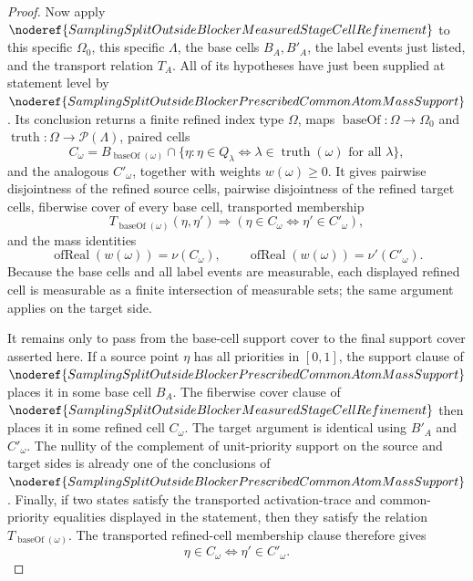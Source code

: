 \begin{proof}
Now apply
\(\noderef{SamplingSplitOutsideBlockerMeasuredStageCellRefinement}\) to this
specific \(\Omega_0\), this specific \(\Lambda\), the base cells
\(B_A,B'_A\), the label events just listed, and the transport relation
\(T_A\).  All of its hypotheses have just been supplied at statement level by
\(\noderef{SamplingSplitOutsideBlockerPrescribedCommonAtomMassSupport}\).
Its conclusion returns a finite refined index type \(\Omega\), maps
\(\operatorname{baseOf}:\Omega\to\Omega_0\) and
\(\operatorname{truth}:\Omega\to\mathcal P(\Lambda)\), paired cells
\[
  C_\omega
  =B_{\operatorname{baseOf}(\omega)}
    \cap\{\eta:\eta\in Q_\lambda\Longleftrightarrow
      \lambda\in\operatorname{truth}(\omega)\text{ for all }\lambda\},
\]
and the analogous \(C'_\omega\), together with weights \(w(\omega)\ge0\).
It gives pairwise disjointness of the refined source cells, pairwise
disjointness of the refined target cells, fiberwise cover of every base cell,
transported membership
\[
  T_{\operatorname{baseOf}(\omega)}(\eta,\eta')
  \Longrightarrow
  (\eta\in C_\omega\Longleftrightarrow\eta'\in C'_\omega),
\]
and the mass identities
\[
  \operatorname{ofReal}(w(\omega))=\nu(C_\omega),\qquad
  \operatorname{ofReal}(w(\omega))=\nu'(C'_\omega).
\]
Because the base cells and all label events are measurable, each displayed
refined cell is measurable as a finite intersection of measurable sets; the
same argument applies on the target side.

It remains only to pass from the base-cell support cover to the final support
cover asserted here.  If a source point \(\eta\) has all priorities in
\([0,1]\), the support clause of
\(\noderef{SamplingSplitOutsideBlockerPrescribedCommonAtomMassSupport}\)
places it in some base cell \(B_A\).  The fiberwise cover clause of
\(\noderef{SamplingSplitOutsideBlockerMeasuredStageCellRefinement}\) then
places it in some refined cell \(C_\omega\).  The target argument is
identical using \(B'_A\) and \(C'_\omega\).  The nullity of the complement of
unit-priority support on the source and target sides is already one of the
conclusions of
\(\noderef{SamplingSplitOutsideBlockerPrescribedCommonAtomMassSupport}\).
Finally, if two states satisfy the transported activation-trace and
common-priority equalities displayed in the statement, then they satisfy the
relation \(T_{\operatorname{baseOf}(\omega)}\).  The transported refined-cell
membership clause therefore gives
\[
  \eta\in C_\omega\Longleftrightarrow\eta'\in C'_\omega .
\]


\end{proof}

